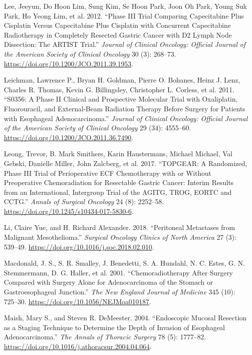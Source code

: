 \documentclass[
  letterpaper,
]{scrbook}
\newlength{\cslhangindent}
\newenvironment{CSLReferences}[2] %
 {\begin{list}{}{%
  \setlength{\itemindent}{0pt}
  \setlength{\leftmargin}{0pt}
  \setlength{\parsep}{0pt}
  \ifodd #1
   \setlength{\leftmargin}{\cslhangindent}
   \setlength{\itemindent}{-1\cslhangindent}
  \fi
  \setlength{\itemsep}{#2\baselineskip}}}
 {\end{list}}
\begin{document}
\begin{CSLReferences}{1}{0}
Lee, Jeeyun, Do Hoon Lim, Sung Kim, Se Hoon Park, Joon Oh Park, Young
Suk Park, Ho Yeong Lim, et al. 2012. {``Phase {III} Trial Comparing
Capecitabine Plus Cisplatin Versus Capecitabine Plus Cisplatin with
Concurrent Capecitabine Radiotherapy in Completely Resected Gastric
Cancer with {D2} Lymph Node Dissection: The {ARTIST} Trial.''}
\emph{Journal of Clinical Oncology: Official Journal of the American
Society of Clinical Oncology} 30 (3): 268--73.
\url{https://doi.org/10.1200/JCO.2011.39.1953}.

Leichman, Lawrence P., Bryan H. Goldman, Pierre O. Bohanes, Heinz J.
Lenz, Charles R. Thomas, Kevin G. Billingsley, Christopher L. Corless,
et al. 2011. {``S0356: A Phase {II} Clinical and Prospective Molecular
Trial with Oxaliplatin, Fluorouracil, and External-Beam Radiation
Therapy Before Surgery for Patients with Esophageal Adenocarcinoma.''}
\emph{Journal of Clinical Oncology: Official Journal of the American
Society of Clinical Oncology} 29 (34): 4555--60.
\url{https://doi.org/10.1200/JCO.2011.36.7490}.

Leong, Trevor, B. Mark Smithers, Karin Haustermans, Michael Michael, Val
Gebski, Danielle Miller, John Zalcberg, et al. 2017. {``{TOPGEAR}: {A}
{Randomized}, {Phase} {III} {Trial} of {Perioperative} {ECF}
{Chemotherapy} with or {Without} {Preoperative} {Chemoradiation} for
{Resectable} {Gastric} {Cancer}: {Interim} {Results} from an
{International}, {Intergroup} {Trial} of the {AGITG}, {TROG}, {EORTC}
and {CCTG}.''} \emph{Annals of Surgical Oncology} 24 (8): 2252--58.
\url{https://doi.org/10.1245/s10434-017-5830-6}.

Li, Claire Yue, and H. Richard Alexander. 2018. {``Peritoneal
{Metastases} from {Malignant} {Mesothelioma}.''} \emph{Surgical Oncology
Clinics of North America} 27 (3): 539--49.
\url{https://doi.org/10.1016/j.soc.2018.02.010}.

Macdonald, J. S., S. R. Smalley, J. Benedetti, S. A. Hundahl, N. C.
Estes, G. N. Stemmermann, D. G. Haller, et al. 2001.
{``Chemoradiotherapy After Surgery Compared with Surgery Alone for
Adenocarcinoma of the Stomach or Gastroesophageal Junction.''} \emph{The
New England Journal of Medicine} 345 (10): 725--30.
\url{https://doi.org/10.1056/NEJMoa010187}.

Maish, Mary S., and Steven R. DeMeester. 2004. {``Endoscopic Mucosal
Resection as a Staging Technique to Determine the Depth of Invasion of
Esophageal Adenocarcinoma.''} \emph{The Annals of Thoracic Surgery} 78
(5): 1777--82. \url{https://doi.org/10.1016/j.athoracsur.2004.04.064}.


\end{CSLReferences}
\end{document}
